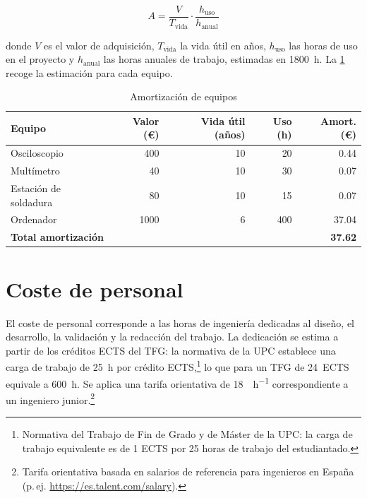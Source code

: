 \begin{equation}
    A = \frac{V}{T_{\text{vida}}} \cdot \frac{h_{\text{uso}}}{h_{\text{anual}}}
    \label{eq:amortizacion}
\end{equation}

donde $V$ es el valor de adquisición, $T_{\text{vida}}$ la vida útil en años,
$h_{\text{uso}}$ las horas de uso en el proyecto y $h_{\text{anual}}$ las horas
anuales de trabajo, estimadas en \SI{1800}{\hour}. La \cref{tab:pres_equipos} recoge
la estimación para cada equipo.

\begin{table}[H]
    \centering
    \caption{Amortización de equipos}
    \label{tab:pres_equipos}
    \footnotesize
    \begin{tabularx}{\linewidth}{X r r r r}
        \toprule
        \textbf{Equipo} & \textbf{Valor (\euro)} & \textbf{Vida útil (años)} & \textbf{Uso (h)} & \textbf{Amort. (\euro)} \\
        \midrule
        Osciloscopio            & \num{400}  & \num{10} & \num{20}  & \num{0.44}  \\
        Multímetro              & \num{40}   & \num{10} & \num{30}  & \num{0.07}  \\
        Estación de soldadura   & \num{80}   & \num{10} & \num{15}  & \num{0.07}  \\
        Ordenador               & \num{1000} & \num{6}  & \num{400} & \num{37.04} \\
        \midrule
        \textbf{Total amortización} & & & & \textbf{\num{37.62}} \\
        \bottomrule
    \end{tabularx}
\end{table}

\section{Coste de personal}
\label{sec:pres_personal}

El coste de personal corresponde a las horas de ingeniería dedicadas al diseño, el
desarrollo, la validación y la redacción del trabajo. La dedicación se estima a
partir de los créditos ECTS del TFG: la normativa de la UPC establece una carga de
trabajo de \SI{25}{\hour} por crédito ECTS,\footnote{Normativa del Trabajo de Fin de Grado y de Máster de la UPC: la carga de trabajo equivalente es de 1 ECTS por 25 horas de trabajo del estudiantado.} lo que para un TFG de \num{24}~ECTS
equivale a \SI{600}{\hour}. Se aplica una tarifa orientativa de
\SI{18}{\eur\per\hour} correspondiente a un ingeniero junior.\footnote{Tarifa orientativa basada en salarios de referencia para ingenieros en España (p.\,ej. \url{https://es.talent.com/salary}).}

